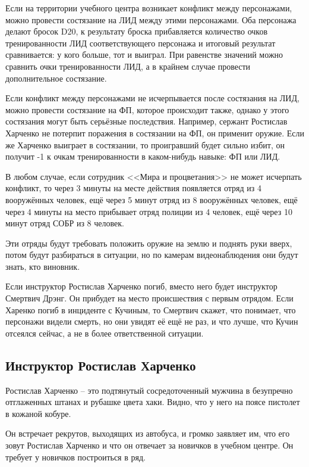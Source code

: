 \documentclass{article}
\begin{document}
Если на территории учебного центра возникает конфликт между персонажами,
можно провести состязание на ЛИД между этими персонажами. Оба персонажа
делают бросок D20, к результату броска прибавляется количество очков
тренированности ЛИД соответствующего персонажа и итоговый результат
сравнивается: у кого больше, тот и выиграл. При равенстве значений можно
сравнить очки тренированности ЛИД, а в крайнем случае провести
дополнительное состязание.

Если конфликт между персонажами не исчерпывается после состязания на
ЛИД, можно провести состязание на ФП, которое происходит также, однако у
этого состязания могут быть серьёзные последствия. Например, сержант
Ростислав Харченко не потерпит поражения в состязании на ФП, он применит
оружие. Если же Харченко выиграет в состязании, то проигравший будет
сильно избит, он получит -1 к очкам тренированности в каком-нибудь
навыке: ФП или ЛИД.

В любом случае, если сотрудник <<Мира и процветания>> не может исчерпать
конфликт, то через 3 минуты на месте действия появляется отряд из 4
вооружённых человек, ещё через 5 минут отряд из 8 вооружённых человек,
ещё через 4 минуты на место прибывает отряд полиции из 4 человек, ещё
через 10 минут отряд СОБР из 8 человек.

Эти отряды будут требовать положить оружие на землю и поднять руки
вверх, потом будут разбираться в ситуации, но по камерам видеонаблюдения
они будут знать, кто виновник.

Если инструктор Ростислав Харченко погиб, вместо него будет инструктор
Смертвич Дрэнг. Он прибудет на место происшествия с первым отрядом. Если
Харенко погиб в инциденте с Кучиным, то Смертвич скажет, что понимает,
что персонажи видели смерть, но они увидят её ещё не раз, и что лучше,
что Кучин отсеялся сейчас, а не в более ответственной ситуации.

\subsection{Инструктор Ростислав
Харченко}\label{instructor-harchenko}

Ростислав Харченко -- это подтянутый сосредоточенный мужчина в
безупречно отглаженных штанах и рубашке цвета хаки. Видно, что у него на
поясе пистолет в кожаной кобуре.

Он встречает рекрутов, выходящих из автобуса, и громко заявляет им, что
его зовут Ростислав Харченко и что он отвечает за новичков в учебном
центре. Он требует у новичков построиться в ряд.
\end{document}

